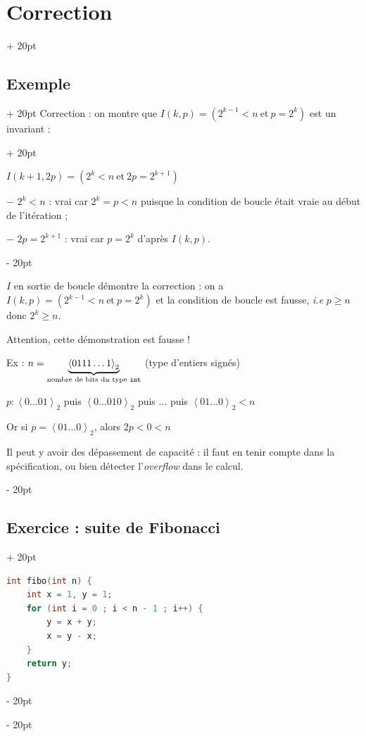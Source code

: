 \documentclass[a4paper, 12pt, twoside]{article}
\newcommand{\lrangle}[1]{\left\langle #1 \right\rangle}
\renewcommand{\le}{\leqslant}
\renewcommand{\ge}{\geqslant}
\newcommand{\ind}[1][20pt]{\advance\leftskip + #1}
\newcommand{\deind}[1][20pt]{\advance\leftskip - #1}
\newenvironment{indentedenv}[1][20pt]{\par \ind[#1]}{\par \deind}
\newenvironment{indt}[2][20pt]{#2 \begin{indentedenv}[#1]}{\end{indentedenv}} %
\begin{document}
\begin{indt}{\section{Correction}}
\begin{indt}{\subsection{Exemple}}
\begin{indt}{Correction : on montre que $I(k, p) = (2^{k - 1} < n\ \text{et}\ p = 2^k)$ est un invariant :}
                \vspace{6pt}
                
                $I(k + 1, 2p) = (2^k < n\ \text{et}\ 2p = 2^{k + 1})$
                
                \vspace{6pt}
                
                $-$ $2^k < n$ : vrai car $2^k = p < n$ puisque la condition de boucle était vraie au début de l'itération ;
                
                $-$ $2p = 2^{k + 1}$ : vrai car $p = 2^k$ d'après $I(k, p)$.
            \end{indt}
            
            \vspace{6pt}
            
            $I$ en sortie de boucle démontre la correction : on a $I(k, p) = (2^{k -1} < n\ \text{et}\ p = 2^k)$ et la condition de boucle est fausse, \textit{i.e} $p \ge n$ donc $2^k \ge n$. %
            
            \vspace{12pt}
            
            Attention, cette démonstration est fausse !
            
            Ex : $n = \underbrace{\lrangle{0111\ldots1}_2}_{\text{nombre de bits du type \texttt{int}}}$ (type d'entiers signés)
            
            $p : \lrangle{0\ldots01}_2$ puis $\lrangle{0\ldots010}_2$ puis $\ldots$ puis $\lrangle{01\ldots0}_2 < n$
            
            Or si $p = \lrangle{01\ldots0}_2$, alors $2p < 0 < n$
            
            \vspace{6pt}
            
            Il peut y avoir des dépassement de capacité : il faut en tenir compte dans la spécification, ou bien détecter l'\textit{overflow} dans le calcul.
        \end{indt}
        
        
        \begin{indt}{\subsection{Exercice : suite de Fibonacci}}
            \begin{lstlisting}[language=C, xleftmargin=60pt]
int fibo(int n) {
    int x = 1, y = 1;
    for (int i = 0 ; i < n - 1 ; i++) {
        y = x + y;
        x = y - x;
    }
    return y;
}\end{lstlisting}
            

\end{indt}
\end{indt}
\end{document}
